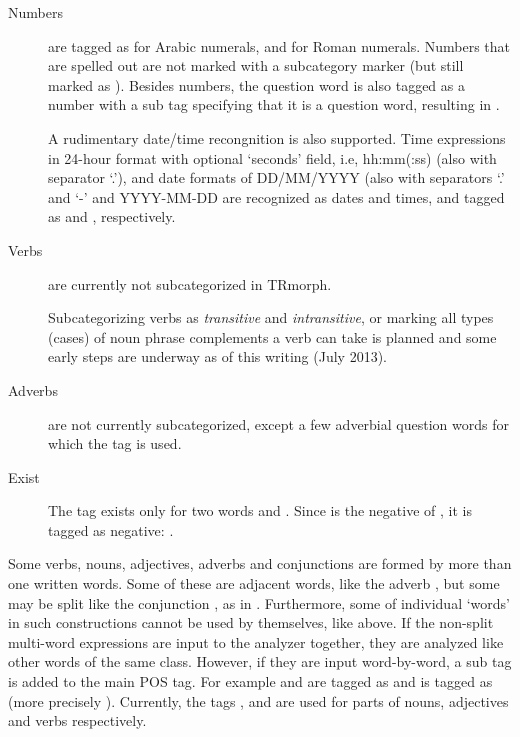 \documentclass[twocolumn]{article}
\begin{document}
\begin{description}
\item[Numbers] are tagged as  for Arabic numerals,
and  for Roman numerals. Numbers that are spelled
out are not marked with a subcategory marker (but still marked as
). Besides numbers, the question word 
is also tagged as a number with a sub tag specifying that it is a
question word, resulting in .

A rudimentary date/time recongnition is also supported.
Time expressions in 24-hour format with optional `seconds' field, 
i.e,  hh:mm(:ss) (also with separator `.'), 
and date formats of DD/MM/YYYY (also with separators `.' and `-' 
and YYYY-MM-DD are recognized as dates and times, 
and tagged as  and , respectively.

\item[Verbs] are currently not subcategorized in TRmorph. 

Subcategorizing verbs as \emph{transitive} and \emph{intransitive}, or
marking all types (cases) of noun phrase complements a verb can take
is planned and some early steps are underway as of this writing (July
2013).
\item[Adverbs] are not currently subcategorized, except a few adverbial
question words for which the tag  is used.

\item[Exist] The tag  exists only for two words
 and  . 
Since  is the negative of , it is tagged as
negative: .
\end{description}

Some verbs, nouns, adjectives, adverbs and conjunctions are formed by
more than one written words. Some of these are adjacent words, like
the adverb , but some may be split like
the conjunction , as in . Furthermore, some of individual
`words' in such constructions cannot be used by themselves, like
 above. If the non-split multi-word expressions are input
to the analyzer together, they are analyzed like other words of the
same class. However, if they are input word-by-word, a sub tag
 is added to the main POS tag. For example
 and  are tagged as  and
 is tagged as  (more precisely
). Currently, the tags
,  and
 are used for parts of nouns, adjectives and
verbs respectively.
\end{document}
